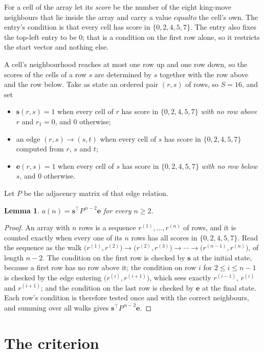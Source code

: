 \documentclass[11pt,a4paper]{article}
\theoremstyle{plain}
\newtheorem{lemma}[theorem]{Lemma}
\theoremstyle{definition}
\begin{document}
For a cell of the array let its \emph{score} be the number of the eight king-move neighbours that lie inside
the array and carry a value $equal to$ the cell's own. The entry's condition is that every cell
has score in $\{0,2,4,5,7\}$. The entry also fixes the top-left entry to be $0$; that is a condition on the first row alone, so it restricts the start vector and nothing else.

A cell's neighbourhood reaches at most one row up and one row down, so the scores of the
cells of a row $s$ are determined by $s$ together with the row above and the row below.
Take as state an ordered pair $(r,s)$ of rows, so $S=16$, and set
\begin{itemize}
\item $\mathbf{s}(r,s)=1$ when every cell of $r$ has score in $\{0,2,4,5,7\}$ \emph{with no row
above $r$} and $r_1=0$, and $0$ otherwise;
\item an edge $(r,s)\to(s,t)$ when every cell of $s$ has score in $\{0,2,4,5,7\}$ computed from
$r$, $s$ and $t$;
\item $\mathbf{e}(r,s)=1$ when every cell of $s$ has score in $\{0,2,4,5,7\}$ \emph{with no row
below $s$}, and $0$ otherwise.
\end{itemize}
Let $P$ be the adjacency matrix of that edge relation.

\begin{lemma}\label{lem:walk}
$a(n)=\mathbf{s}^{\!\top}P^{\,n-2}\mathbf{e}$ for every $n\ge2$.
\end{lemma}

\begin{proof}
An array with $n$ rows is a sequence $r^{(1)},\dots,r^{(n)}$ of rows, and it is counted
exactly when every one of its $n$ rows has all scores in $\{0,2,4,5,7\}$. Read the sequence as the
walk $\bigl(r^{(1)},r^{(2)}\bigr)\to\bigl(r^{(2)},r^{(3)}\bigr)\to\cdots\to
\bigl(r^{(n-1)},r^{(n)}\bigr)$, of length $n-2$. The condition on the first row is
checked by $\mathbf{s}$ at the initial state, because a first row has no row above it; the
condition on row $i$ for $2\le i\le n-1$ is checked by the edge entering
$\bigl(r^{(i)},r^{(i+1)}\bigr)$, which sees exactly $r^{(i-1)}$, $r^{(i)}$ and
$r^{(i+1)}$; and the condition on the last row is checked by $\mathbf{e}$ at the final
state. Each row's condition is therefore tested once and with the correct neighbours, and
summing over all walks gives $\mathbf{s}^{\!\top}P^{\,n-2}\mathbf{e}$.
\end{proof}

\section{The criterion}
\end{document}
